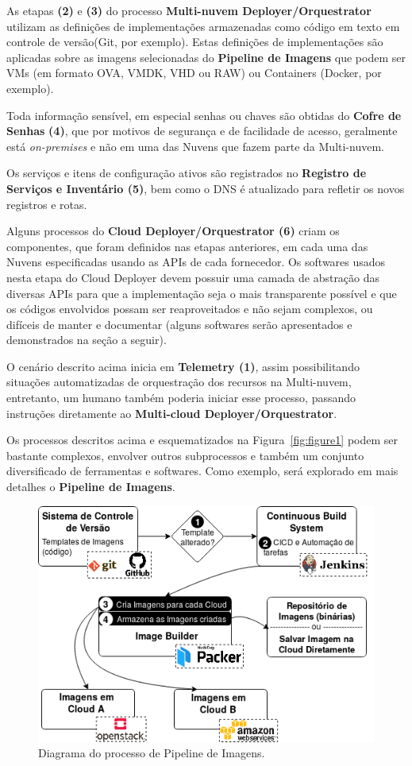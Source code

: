 \documentclass[12pt]{article}
\begin{document}
	 As etapas \textbf{(2)} e \textbf{(3)} do processo \textbf{Multi-nuvem Deployer/Orquestrator} utilizam as definições de implementações armazenadas como código em texto em controle de versão(Git, por exemplo). Estas definições de implementações são aplicadas sobre as imagens selecionadas do \textbf{Pipeline de Imagens} que podem ser VMs (em formato OVA, VMDK, VHD ou RAW) ou Containers (Docker, por exemplo).
	
	Toda informação sensível, em especial senhas ou chaves são obtidas do \textbf{Cofre de Senhas} \textbf{(4)}, que por motivos de segurança e de facilidade de acesso, geralmente está \textit{on-premises} e não em uma das Nuvens que fazem parte da Multi-nuvem.   
	
	Os serviços e itens de configuração ativos são registrados no \textbf{Registro de Serviços e Inventário (5)}, bem como o DNS é atualizado para refletir os novos registros e rotas.
	
	Alguns processos do \textbf{Cloud Deployer/Orquestrator (6)} criam os componentes, que foram definidos nas etapas anteriores, em cada uma das Nuvens especificadas usando as APIs de cada fornecedor. Os softwares usados nesta etapa do Cloud Deployer devem possuir uma camada de abstração das diversas APIs para que a implementação seja o mais transparente possível e que os códigos envolvidos possam ser reaproveitados e não sejam complexos, ou difíceis de manter e documentar (alguns softwares serão apresentados e demonstrados na seção a seguir).  

	O cenário descrito acima inicia em \textbf{Telemetry (1)}, assim possibilitando situações automatizadas de orquestração dos recursos na Multi-nuvem, entretanto, um humano também poderia iniciar esse processo, passando instruções diretamente ao \textbf{Multi-cloud Deployer/Orquestrator}.  
	
	Os processos descritos acima e esquematizados na Figura~\ref{fig:figure1} podem ser bastante complexos, envolver outros subprocessos e também um conjunto diversificado de ferramentas e softwares. Como exemplo, será explorado em mais detalhes o \textbf{Pipeline de Imagens}.
		
	\begin{figure}[ht]
		\centering
		\includegraphics[width=0.7\linewidth]{figuras/Figure2.png}
		\caption{Diagrama do processo de Pipeline de Imagens.}
		\label{fig:figure2}
	\end{figure}
    
\end{document}

